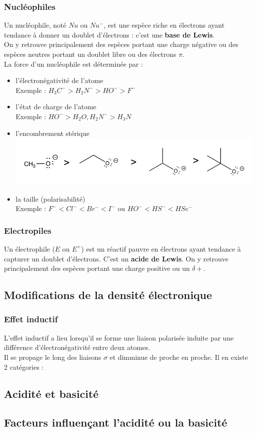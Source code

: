 \documentclass{article}
\newcommand{\insertslide}[2]{
\begin{center}
    \fbox{\texttt{[image: \#1]}}
\end{center}
}
\begin{document}
        \subsubsection{Nucléophiles}
            Un nucléophile, noté $Nu$ ou $Nu^-$, est une espèce riche en électrons ayant tendance à donner un doublet d'électrons : c'est une \textbf{base de Lewis}.\\
            On y retrouve principalement des espèces portant une charge négative ou des espèces neutres portant un doublet libre ou des électrons $\pi$.\\
            La force d'un nucléophile est déterminée par :
            \begin{itemize}
                \item l'électronégativité de l'atome\\
                Exemple : $H_3C^- > H_2N^- > HO^- > F^-$
                \item l'état de charge de l'atome\\
                Exemple : $HO^- > H_2O, H_2N^- > H_3N$
                \item l'encombrement stérique\\
                \includegraphics[scale=.5]{encombrement_sterique.png}
                \item la taille (polarisabilité)\\
                Exemple : $F^- < Cl^- < Br^- < I^-$ ou $HO^- < HS^- < HSe^-$
            \end{itemize}
        \subsubsection{Electropiles}
            Un électrophile ($E$ ou $E^+$) est un réactif pauvre en électrons ayant tendance à capturer un doublet d'électrons. C'est un \textbf{acide de Lewis}.
            On y retrouve principalement des espèces portant une charge positive ou un $\delta +$.
    \subsection{Modifications de la densité électronique}
        \subsubsection{Effet inductif}
            L'effet inductif a lieu lorsqu'il se forme une liaison polarisée induite par une différence d'électronégativité entre deux atomes.\\
            Il se propage le long des liaisons $\sigma$ et dimminue de proche en proche.
            Il en existe 2 catégories :
            \insertslide{Slides/CM3}{20}
    \subsection{Acidité et basicité}
    \subsection{Facteurs influençant l'acidité ou la basicité}
\end{document}
